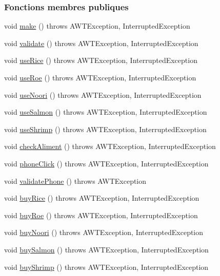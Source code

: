 \subsubsection*{Fonctions membres publiques}
\begin{DoxyCompactItemize}
\item 
void \hyperlink{classTestSushi_1_1src_1_1Suchi_1_1Maki_a220f1b36947e8e081c0240ad1475ec63}{make} ()  throws A\+W\+T\+Exception, Interrupted\+Exception
\item 
void \hyperlink{classTestSushi_1_1src_1_1Suchi_1_1Maki_af3cd57320dc72b995c05f4a3b1f7ab10}{validate} ()  throws A\+W\+T\+Exception, Interrupted\+Exception 
\item 
void \hyperlink{classTestSushi_1_1src_1_1Suchi_1_1Recette_a2d78a4575d1295e34210e2f77c01f3f3}{use\+Rice} ()  throws A\+W\+T\+Exception, Interrupted\+Exception
\item 
void \hyperlink{classTestSushi_1_1src_1_1Suchi_1_1Recette_a8967a205e78d02ef7c30fd435fbaa0af}{use\+Roe} ()  throws A\+W\+T\+Exception, Interrupted\+Exception
\item 
void \hyperlink{classTestSushi_1_1src_1_1Suchi_1_1Recette_a10bfe3c71750c84144203a7aa2c341ee}{use\+Noori} ()  throws A\+W\+T\+Exception, Interrupted\+Exception
\item 
void \hyperlink{classTestSushi_1_1src_1_1Suchi_1_1Recette_a87cd9338767df0e5db88e6005f1da984}{use\+Salmon} ()  throws A\+W\+T\+Exception, Interrupted\+Exception
\item 
void \hyperlink{classTestSushi_1_1src_1_1Suchi_1_1Recette_ab2c165554830ba84a392765621604d44}{use\+Shrimp} ()  throws A\+W\+T\+Exception, Interrupted\+Exception
\item 
void \hyperlink{classTestSushi_1_1src_1_1Suchi_1_1Recette_a83f9f5fb6bfe2691974a5e35386e7b8a}{check\+Aliment} ()  throws A\+W\+T\+Exception, Interrupted\+Exception
\item 
void \hyperlink{classTestSushi_1_1src_1_1Suchi_1_1Recette_ad94006ea131c2379a14c50eec870b69b}{phone\+Click} ()  throws A\+W\+T\+Exception, Interrupted\+Exception
\item 
void \hyperlink{classTestSushi_1_1src_1_1Suchi_1_1Recette_a33f0912e1212b01ea1b3787bed28f0fe}{validate\+Phone} ()  throws A\+W\+T\+Exception
\item 
void \hyperlink{classTestSushi_1_1src_1_1Suchi_1_1Recette_aa0fc4c335f6ab3f905f63a16902a6379}{buy\+Rice} ()  throws A\+W\+T\+Exception, Interrupted\+Exception
\item 
void \hyperlink{classTestSushi_1_1src_1_1Suchi_1_1Recette_ad874ba9daf68328d6b65b09e6f16003e}{buy\+Roe} ()  throws A\+W\+T\+Exception, Interrupted\+Exception
\item 
void \hyperlink{classTestSushi_1_1src_1_1Suchi_1_1Recette_a5602befaaef8858b75c131e50f7cf91d}{buy\+Noori} ()  throws A\+W\+T\+Exception, Interrupted\+Exception
\item 
void \hyperlink{classTestSushi_1_1src_1_1Suchi_1_1Recette_a64cf6254490e04e9e8031d564a4a0ea3}{buy\+Salmon} ()  throws A\+W\+T\+Exception, Interrupted\+Exception
\item 
void \hyperlink{classTestSushi_1_1src_1_1Suchi_1_1Recette_a0d15202c729b3c6b2bb699de4137d551}{buy\+Shrimp} ()  throws A\+W\+T\+Exception, Interrupted\+Exception
\end{DoxyCompactItemize}
